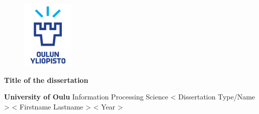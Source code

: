 
\begin{figure}[h!]
    \centering \includegraphics[width = 0.25\linewidth]{img/uni-logo.pdf}
\end{figure}

\vspace{-10em}

\vfill

\begin{center}
    \textbf{{\LARGE {Title of the dissertation}}}
\end{center}

\vfill

\hfill \begin{minipage}{0.35\textwidth}
\noindent \textbf{University of Oulu} \newline
Information Processing Science        \newline
< Dissertation Type/Name >            \newline
< Firstname Lastname >                \newline
< Year >
\end{minipage}

\restoregeometry %

